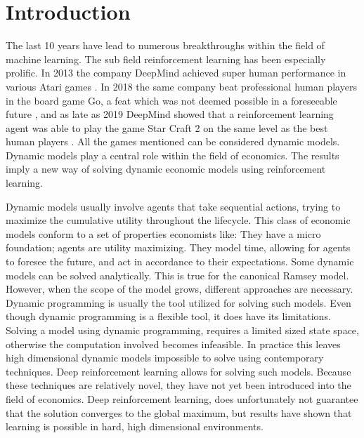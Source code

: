 \section{Introduction} 

The last 10 years have lead to numerous breakthroughs within the field of machine learning. The sub field reinforcement learning has been especially prolific. In 2013 the company DeepMind achieved super human performance in various Atari games \parencite{mnih_playing_2013}. In 2018 the same company beat professional human players in the board game Go, a feat which was not deemed possible in a foreseeable future \parencite{silver_general_2018}, and as late as 2019 DeepMind showed that a reinforcement learning agent was able to play the game Star Craft 2 on the same level as the best human players \parencite{vinyals_grandmaster_2019}. All the games mentioned can be considered dynamic models. Dynamic models play a central role within the field of economics. The results imply a new way of solving dynamic economic models using reinforcement learning.

Dynamic models usually involve agents that take sequential actions, trying to maximize the cumulative utility throughout the lifecycle. This class of economic models conform to a set of properties economists like: They have a micro foundation; agents are utility maximizing. They model time, allowing for agents to foresee the future, and act in accordance to their expectations. Some dynamic models can be solved  analytically. This is true for the canonical Ramsey model. However, when the scope of the model grows, different approaches are necessary. Dynamic programming is usually the tool utilized for solving such models.  Even though dynamic programming is a flexible tool, it does have its limitations. Solving a model using dynamic programming, requires a limited sized state space, otherwise the computation involved becomes infeasible. In practice this leaves high dimensional dynamic models impossible to solve using contemporary techniques. Deep reinforcement learning allows for solving such models. Because these techniques are relatively novel, they have not yet been introduced into the field of economics. Deep reinforcement learning, does unfortunately not guarantee that the solution converges to the global maximum, but results have shown that learning is possible in hard, high dimensional environments.

